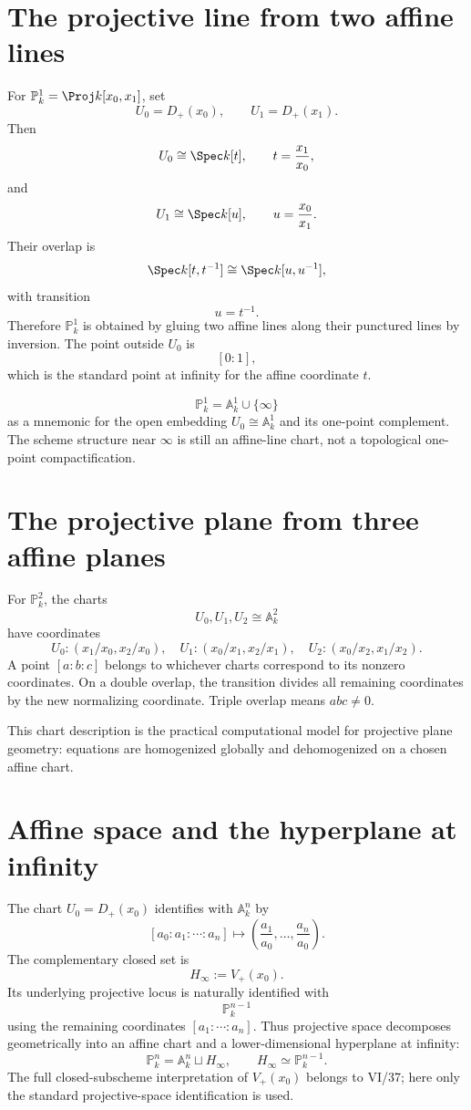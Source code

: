 

\section{The projective line from two affine lines}
For \(\mathbb P^1_k=\Proj k[x_0,x_1]\), set
\[
U_0=D_+(x_0),\qquad U_1=D_+(x_1).
\]
Then
\[
U_0\cong\Spec k[t],\qquad t=\frac{x_1}{x_0},
\]
and
\[
U_1\cong\Spec k[u],\qquad u=\frac{x_0}{x_1}.
\]
Their overlap is
\[
\Spec k[t,t^{-1}]\cong\Spec k[u,u^{-1}],
\]
with transition
\[
u=t^{-1}.
\]
Therefore \(\mathbb P^1_k\) is obtained by gluing two affine lines along their punctured lines by inversion.  The point outside \(U_0\) is
\[
[0:1],
\]
which is the standard point at infinity for the affine coordinate \(t\).

\begin{corollary}
\[
\mathbb P^1_k=\mathbb A^1_k\cup\{\infty\}
\]
as a mnemonic for the open embedding \(U_0\cong\mathbb A^1_k\) and its one-point complement.  The scheme structure near \(\infty\) is still an affine-line chart, not a topological one-point compactification.
\end{corollary}



\section{The projective plane from three affine planes}
For \(\mathbb P^2_k\), the charts
\[
U_0,U_1,U_2\cong\mathbb A^2_k
\]
have coordinates
\[
U_0:(x_1/x_0,x_2/x_0),\quad
U_1:(x_0/x_1,x_2/x_1),\quad
U_2:(x_0/x_2,x_1/x_2).
\]
A point \([a:b:c]\) belongs to whichever charts correspond to its nonzero coordinates.  On a double overlap, the transition divides all remaining coordinates by the new normalizing coordinate.  Triple overlap means \(abc\ne0\).

This chart description is the practical computational model for projective plane geometry: equations are homogenized globally and dehomogenized on a chosen affine chart.

\section{Affine space and the hyperplane at infinity}
The chart \(U_0=D_+(x_0)\) identifies with \(\mathbb A^n_k\) by
\[
[a_0:a_1:\cdots:a_n]\longmapsto
\left(\frac{a_1}{a_0},\ldots,\frac{a_n}{a_0}\right).
\]
The complementary closed set is
\[
H_\infty:=V_+(x_0).
\]
Its underlying projective locus is naturally identified with
\[
\mathbb P^{n-1}_k
\]
using the remaining coordinates \([a_1:\cdots:a_n]\).  Thus projective space decomposes geometrically into an affine chart and a lower-dimensional hyperplane at infinity:
\[
\boxed{\mathbb P^n_k=\mathbb A^n_k\sqcup H_\infty,\qquad H_\infty\simeq\mathbb P^{n-1}_k.}
\]
The full closed-subscheme interpretation of \(V_+(x_0)\) belongs to VI/37; here only the standard projective-space identification is used.


